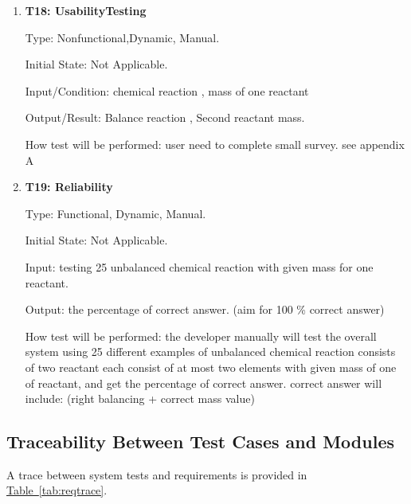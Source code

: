 \documentclass[12pt, titlepage]{article}
\begin{document}
\begin{enumerate}

\item{ \bf T18: UsabilityTesting\\}

Type:  Nonfunctional,Dynamic, Manual.
					
Initial State:  Not Applicable.
					
Input/Condition: chemical reaction ,  mass of one reactant
					
Output/Result: Balance reaction , Second reactant mass.
					
How test will be performed: user need to complete small survey. see appendix A 
					
\item{\bf T19: Reliability\\}

Type: Functional, Dynamic, Manual.
					
Initial State:  Not Applicable.
					
Input: testing 25 unbalanced chemical reaction with given mass for one reactant.
					
Output: the percentage of correct answer. (aim for 100 \% correct answer) 
					
How test will be performed: the developer manually will test the overall system using 25 different examples of unbalanced chemical reaction consists of two reactant each consist of at most two elements with given mass of one of reactant, and get the percentage of correct answer. correct answer will include: (right balancing + correct mass value) 

\end{enumerate}
		

\subsection{Traceability Between Test Cases and Modules}

A trace between system tests and requirements is provided in 
\hyperref[tab:reqtrace]{Table~\ref*{tab:reqtrace}}.

\begin{table}[h!]
\centering
{}
\caption{Traceability Matrix Showing the Connections Between Modules and Test Cases}
\label{tab:reqtrace}
\end{table}
\end{document}
